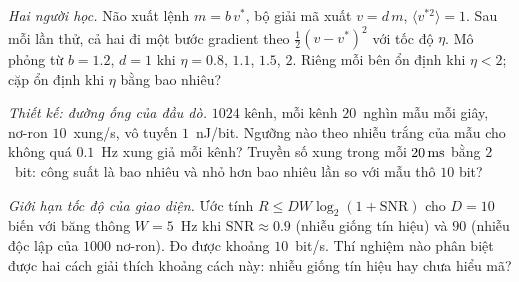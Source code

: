 \begin{exercise}[\lvlB]
\label{ex:17:5}
\emph{Hai người học.} Não xuất lệnh $m=b\,v^*$, bộ giải mã xuất $v=d\,m$, $\langle v^{*2}\rangle=1$. Sau mỗi lần thử, cả hai đi một bước gradient theo $\tfrac12(v-v^*)^2$ với tốc độ $\eta$. Mô phỏng từ $b=1.2$, $d=1$ khi $\eta=0.8$, $1.1$, $1.5$, $2$. Riêng mỗi bên ổn định khi $\eta<2$; cặp ổn định khi $\eta$ bằng bao nhiêu?
\end{exercise}

\begin{exercise}[\lvlB]
\label{ex:17:6}
\emph{Thiết kế: đường ống của đầu dò.} $1024$ kênh, mỗi kênh $20$~nghìn mẫu mỗi giây, nơ-ron $10$~xung/s, vô tuyến $1$~nJ/bit. Ngưỡng nào theo nhiễu trắng của mẫu cho không quá $0.1$~Hz xung giả mỗi kênh? Truyền số xung trong mỗi $20\,\text{ms}$ bằng $2$~bit: công suất là bao nhiêu và nhỏ hơn bao nhiêu lần so với mẫu thô $10$ bit?
\end{exercise}

\begin{exercise}[\lvlC]
\label{ex:17:7}
\emph{Giới hạn tốc độ của giao diện.} Ước tính $R\le DW\log_2(1+\text{SNR})$ cho $D=10$ biến với băng thông $W=5$~Hz khi $\text{SNR}\approx0.9$ (nhiễu giống tín hiệu) và $90$ (nhiễu độc lập của $1000$ nơ-ron). Đo được khoảng $10$~bit/s. Thí nghiệm nào phân biệt được hai cách giải thích khoảng cách này: nhiễu giống tín hiệu hay chưa hiểu mã?
\end{exercise}

